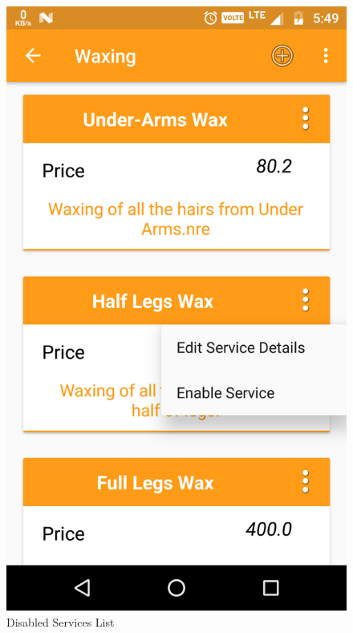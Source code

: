 \\
\begin{figure}[h]
	\centering
	\includegraphics[width=0.7\linewidth]{DisabledServiceList}
	\caption{Disabled Services List}
\end{figure}
\pagebreak

